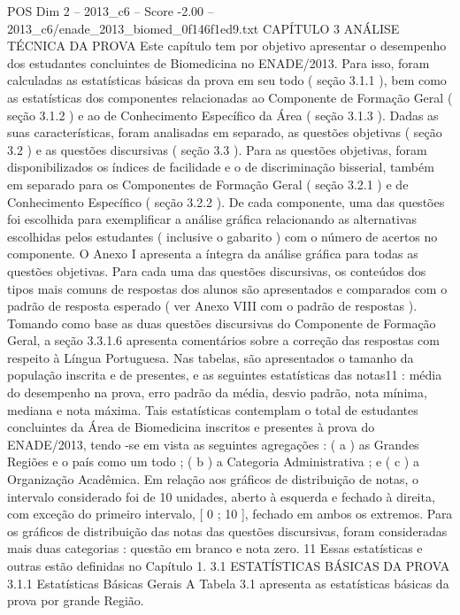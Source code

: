 \begin{textsample}{POS Dim 2 – 2013\_c6 – Score -2.00 – 2013\_c6/enade\_2013\_biomed\_0f146f1ed9.txt}  \label{ex:f2_pos_381}
CAPÍTULO 3 ANÁLISE TÉCNICA DA PROVA Este capítulo tem por objetivo apresentar o desempenho dos estudantes concluintes de Biomedicina no ENADE/2013.
Para isso, foram calculadas as estatísticas básicas da prova em seu todo ( seção 3.1.1 ), bem como as estatísticas dos componentes relacionadas ao Componente de Formação Geral ( seção 3.1.2 ) e ao de Conhecimento Específico da Área ( seção 3.1.3 ).
Dadas as suas características, foram analisadas em separado, as questões objetivas ( seção 3.2 ) e as questões discursivas ( seção 3.3 ).
Para as questões objetivas, foram disponibilizados os índices de facilidade e o de discriminação bisserial, também em separado para os Componentes de Formação Geral ( seção 3.2.1 ) e de Conhecimento Específico ( seção 3.2.2 ).
De cada componente, uma das questões foi escolhida para exemplificar a análise gráfica relacionando as alternativas escolhidas pelos estudantes ( inclusive o gabarito ) com o número de acertos no componente.
O Anexo I apresenta a íntegra da análise gráfica para todas as questões objetivas.
Para cada uma das questões discursivas, os conteúdos dos tipos mais comuns de respostas dos alunos são apresentados e comparados com o padrão de resposta esperado ( ver Anexo VIII com o padrão de respostas ).
Tomando como base as duas questões discursivas do Componente de Formação Geral, a seção 3.3.1.6 apresenta comentários sobre a correção das respostas com respeito à Língua Portuguesa.
Nas tabelas, são apresentados o tamanho da população inscrita e de presentes, e as seguintes estatísticas das notas11 : média do desempenho na prova, erro padrão da média, desvio padrão, nota mínima, mediana e nota máxima.
Tais estatísticas contemplam o total de estudantes concluintes da Área de Biomedicina inscritos e presentes à prova do ENADE/2013, tendo -se em vista as seguintes agregações : ( a ) as Grandes Regiões e o país como um todo ; ( b ) a Categoria Administrativa ; e ( c ) a Organização Acadêmica.
Em relação aos gráficos de distribuição de notas, o intervalo considerado foi de 10 unidades, aberto à esquerda e fechado à direita, com exceção do primeiro intervalo, [ 0 ; 10 ], fechado em ambos os extremos.
Para os gráficos de distribuição das notas das questões discursivas, foram consideradas mais duas categorias : questão em branco e nota zero. 11 Essas estatísticas e outras estão definidas no Capítulo 1. 3.1 ESTATÍSTICAS BÁSICAS DA PROVA 3.1.1 Estatísticas Básicas Gerais A Tabela 3.1 apresenta as estatísticas básicas da prova por grande Região.

\end{textsample}
